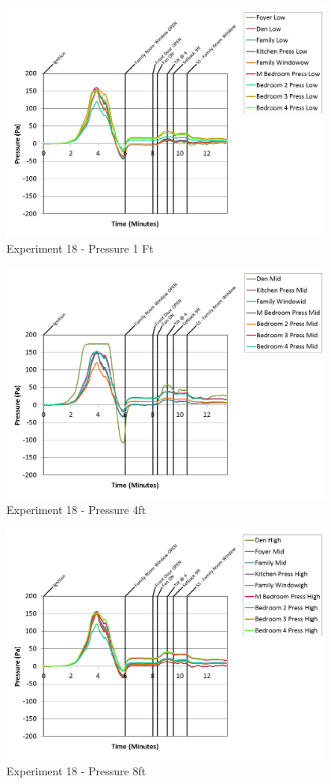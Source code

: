 \documentclass{article}
\begin{document}
\begin{appendices}
\clearpage

\begin{figure}[h!]
	\centering
	\includegraphics[height=3.05in]{0_Images/Results_Charts/Exp_18_Charts/Pressure1Ft.png}
	\caption{Experiment 18 - Pressure 1 Ft}
\end{figure}


\begin{figure}[h!]
	\centering
	\includegraphics[height=3.05in]{0_Images/Results_Charts/Exp_18_Charts/Pressure4ft.png}
	\caption{Experiment 18 - Pressure 4ft}
\end{figure}

\clearpage

\begin{figure}[h!]
	\centering
	\includegraphics[height=3.05in]{0_Images/Results_Charts/Exp_18_Charts/Pressure8ft.png}
	\caption{Experiment 18 - Pressure 8ft}
\end{figure}



\end{appendices}
\end{document}
